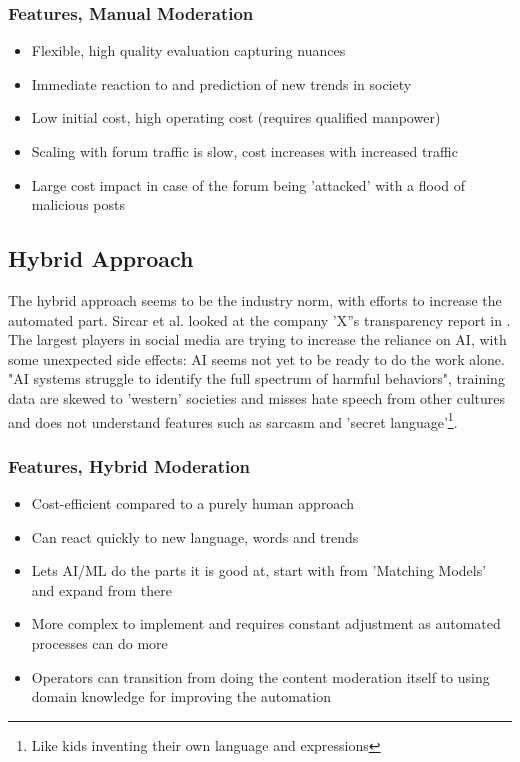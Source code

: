 \documentclass[
	letterpaper, %
	12pt, %
	unnumberedsections, %
	twoside, %
]{LTJournalArticle}
\begin{document}
\subsubsection*{Features, Manual Moderation}
\begin{itemize}
	\item Flexible, high quality evaluation capturing nuances
	\item Immediate reaction to and prediction of new trends in society
	\item Low initial cost, high operating cost (requires qualified manpower)
	\item Scaling with forum traffic is slow, cost increases with increased traffic
	\item Large cost impact in case of the forum being 'attacked' with a flood of malicious posts
\end{itemize}



\subsection{Hybrid Approach}
The hybrid approach seems to be the industry norm, with efforts to increase the automated part. Sircar et al. looked at the company 'X''s transparency report in \cite{ForbesXFindings}. The largest players in social media are trying to increase the reliance on AI, with some unexpected side effects: AI seems not yet to be ready to do the work alone. "AI systems struggle to identify the full spectrum of harmful behaviors"\cite{ForbesXFindings}, training data are skewed to 'western' societies and misses hate speech from other cultures and does not understand features such as sarcasm and 'secret language'\footnote{Like kids inventing their own language and expressions}.

\subsubsection*{Features, Hybrid Moderation}
\begin{itemize}
	\item Cost-efficient compared to a purely human approach
	\item Can react quickly to new language, words and trends
	\item Lets AI/ML do the parts it is good at, start with from 'Matching Models' and expand from there
	\item More complex to implement and requires constant adjustment as automated processes can do more
	\item Operators can transition from doing the content moderation itself to using domain knowledge for improving the automation
\end{itemize}
\end{document}
